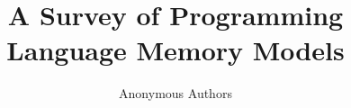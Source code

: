 \documentclass[a4paper,twoside,11pt]{article}
\author{Anonymous Authors}
\title{A Survey of Programming Language Memory Models}
\date{}
\numberwithin{equation}{section}
\begin{document}
\maketitle

\begin{abstract}
\end{abstract}








 

\end{document}
